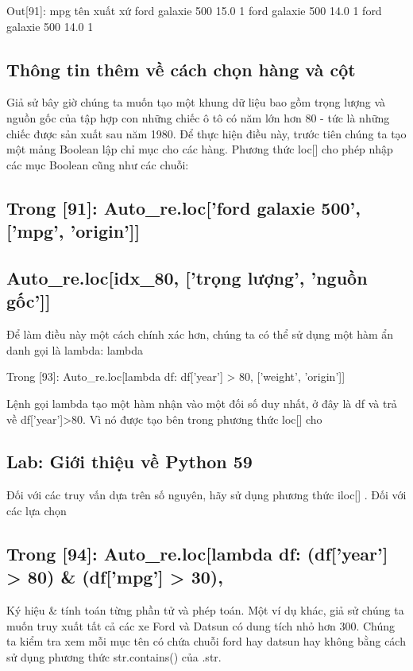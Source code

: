 Out[91]: mpg tên xuất xứ ford galaxie 500 15.0 1 ford galaxie 500 14.0 1 ford galaxie 500 14.0 1

\subsection{Thông tin thêm về cách chọn hàng và cột}

Giả sử bây giờ chúng ta muốn tạo một khung dữ liệu bao gồm trọng lượng và nguồn gốc của tập hợp con những chiếc ô tô có năm lớn hơn 80 - tức là những chiếc được sản xuất sau năm 1980. Để thực hiện điều này, trước tiên chúng ta tạo một mảng Boolean lập chỉ mục cho các hàng. Phương thức loc[] cho phép nhập các mục Boolean cũng như các chuỗi:

\subsection{Trong [91]: Auto\_re.loc['ford galaxie 500',['mpg', 'origin']]}

\subsection{Auto\_re.loc[idx\_80, ['trọng lượng', 'nguồn gốc']]}

Để làm điều này một cách chính xác hơn, chúng ta có thể sử dụng một hàm ẩn danh gọi là lambda: lambda

Trong [93]: Auto\_re.loc[lambda df: df['year'] > 80, ['weight', 'origin']]

Lệnh gọi lambda tạo một hàm nhận vào một đối số duy nhất, ở đây là df và trả về df['year']>80. Vì nó được tạo bên trong phương thức loc[] cho

\subsection{Lab: Giới thiệu về Python 59}

Đối với các truy vấn dựa trên số nguyên, hãy sử dụng phương thức iloc[] . Đối với các lựa chọn

\subsection{Trong [94]: Auto\_re.loc[lambda df: (df['year'] > 80) \& (df['mpg'] > 30),}

Ký hiệu \& tính toán từng phần tử và phép toán. Một ví dụ khác, giả sử chúng ta muốn truy xuất tất cả các xe Ford và Datsun có dung tích nhỏ hơn 300. Chúng ta kiểm tra xem mỗi mục tên có chứa chuỗi ford hay datsun hay không bằng cách sử dụng phương thức str.contains() của .str.

